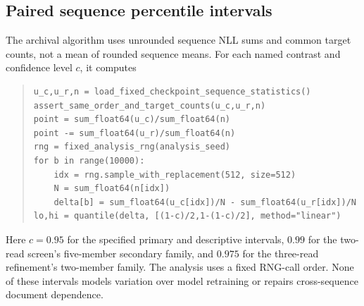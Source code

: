 \documentclass[11pt,letterpaper]{article}
\begin{document}
\subsection{Paired sequence percentile intervals}
The archival algorithm uses unrounded sequence NLL sums and common target
counts, not a mean of rounded sequence means. For each named contrast and
confidence level $c$, it computes
\begin{quote}\small
\begin{verbatim}
u_c,u_r,n = load_fixed_checkpoint_sequence_statistics()
assert_same_order_and_target_counts(u_c,u_r,n)
point = sum_float64(u_c)/sum_float64(n)
point -= sum_float64(u_r)/sum_float64(n)
rng = fixed_analysis_rng(analysis_seed)
for b in range(10000):
    idx = rng.sample_with_replacement(512, size=512)
    N = sum_float64(n[idx])
    delta[b] = sum_float64(u_c[idx])/N - sum_float64(u_r[idx])/N
lo,hi = quantile(delta, [(1-c)/2,1-(1-c)/2], method="linear")
\end{verbatim}
\end{quote}
Here $c=0.95$ for the specified primary and descriptive intervals,
$0.99$ for the two-read screen's five-member
secondary family, and $0.975$ for the three-read refinement's two-member family. The
analysis uses a fixed RNG-call order. None of these intervals
models variation over model retraining or repairs cross-sequence document
dependence.
\end{document}
